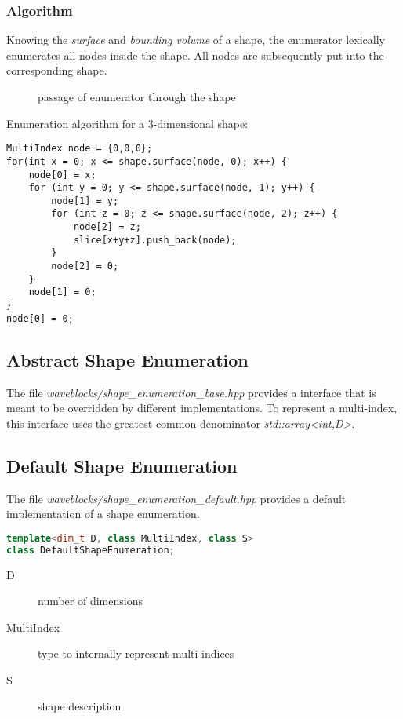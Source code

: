 \documentclass{article}
\begin{document}
\subsubsection{Algorithm}
Knowing the \emph{surface} and  \emph{bounding volume} of a shape, the enumerator lexically enumerates all nodes inside the shape. All nodes are subsequently put into the corresponding shape.

\begin{figure}[htbp]
	\centering
	
	\caption{passage of enumerator through the shape}
	\label{fig:shape_example}
\end{figure}

Enumeration algorithm for a 3-dimensional shape:
\begin{verbatim}
MultiIndex node = {0,0,0};
for(int x = 0; x <= shape.surface(node, 0); x++) {
    node[0] = x;
    for (int y = 0; y <= shape.surface(node, 1); y++) {
        node[1] = y;
        for (int z = 0; z <= shape.surface(node, 2); z++) {
            node[2] = z;
            slice[x+y+z].push_back(node);
        }
        node[2] = 0;
    }
    node[1] = 0;
}
node[0] = 0;
\end{verbatim}

\subsection{Abstract Shape Enumeration}

The file \emph{waveblocks/shape\_enumeration\_base.hpp} provides a interface that is meant to be overridden by different implementations. To represent a multi-index, this interface uses the greatest common denominator \emph{std::array\textless int,D\textgreater}. 

\subsection{Default Shape Enumeration}

The file \emph{waveblocks/shape\_enumeration\_default.hpp} provides a default implementation of a shape enumeration.

\begin{lstlisting}[language=C++, caption={}]
template<dim_t D, class MultiIndex, class S>
class DefaultShapeEnumeration;
\end{lstlisting}

\begin{description}
\item[D] number of dimensions
\item[MultiIndex] type to internally represent multi-indices
\item[S] shape description
\end{description}
\end{document}
